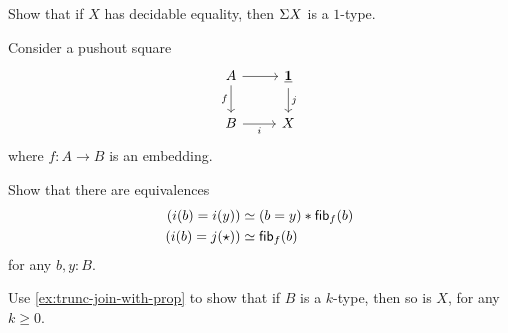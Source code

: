 \begin{exercises}
\item Show that if $X$ has decidable equality, then $\Sigma{X}$ is a $1$-type.
\item Consider a pushout square
  \begin{equation*}
    \begin{tikzcd}
      A \arrow[r] \arrow[d,swap,"f"] & \unit \arrow[d,"j"] \\
      B \arrow[r,swap,"i"] & X
    \end{tikzcd}
  \end{equation*}
  where $f:A\to B$ is an embedding.
  \begin{subexenum}
  \item Show that there are equivalences
  \begin{align*}
    (i(b)=i(y)) & \simeq (b=y)\ast \mathsf{fib}_{f}(b) \\
    (i(b)=j(\star)) & \simeq \mathsf{fib}_{f}(b)
  \end{align*}
  for any $b,y:B$.
  \item Use \cref{ex:trunc-join-with-prop} to show that if $B$ is a $k$-type, then so is $X$, for any $k\geq 0$.
  \end{subexenum}
\end{exercises}
